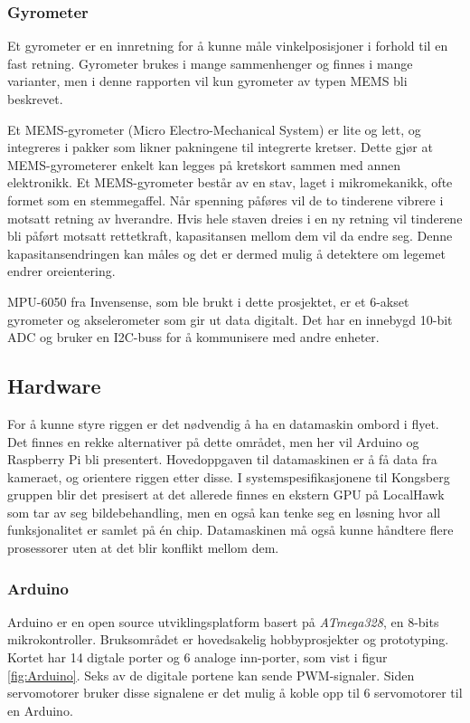 \subsubsection{Gyrometer}

Et gyrometer er en innretning for å kunne måle vinkelposisjoner i forhold til en fast retning. Gyrometer brukes i mange sammenhenger og finnes i mange varianter, men i denne rapporten vil kun gyrometer av typen MEMS bli beskrevet. 

Et MEMS-gyrometer (Micro Electro-Mechanical System) er lite og lett, og integreres i pakker som likner pakningene til integrerte kretser. Dette gjør at MEMS-gyrometerer enkelt kan legges på kretskort sammen med annen elektronikk. Et MEMS-gyrometer består av en stav, laget i mikromekanikk, ofte formet som en stemmegaffel. Når spenning påføres vil de to tinderene vibrere i motsatt retning av hverandre. Hvis hele staven dreies i en ny retning vil tinderene bli påført motsatt rettetkraft, kapasitansen mellom dem vil da endre seg. Denne kapasitansendringen kan måles og det er dermed mulig å detektere om legemet endrer oreientering.\cite{MEMS}

MPU-6050 fra Invensense, som ble brukt i dette prosjektet, er et 6-akset gyrometer og akselerometer som gir ut data digitalt. Det har en innebygd 10-bit ADC og bruker en I2C-buss for å kommunisere med andre enheter.\cite{InSens}

\subsection{Hardware}
For å kunne styre riggen er det nødvendig å ha en datamaskin ombord i flyet. Det finnes en rekke alternativer på dette området, men her vil Arduino og Raspberry Pi bli presentert. Hovedoppgaven til datamaskinen er å få data fra kameraet, og orientere riggen etter disse. I systemspesifikasjonene til Kongsberg gruppen blir det presisert at det allerede finnes en ekstern GPU på LocalHawk som tar av seg bildebehandling, men en også kan tenke seg en løsning hvor all funksjonalitet er samlet på én chip. Datamaskinen må også kunne håndtere flere prosessorer uten at det blir konflikt mellom dem.

\subsubsection{Arduino}
Arduino er en open source utviklingsplatform basert på \textit{ATmega328}, en 8-bits mikrokontroller. Bruksområdet er hovedsakelig hobbyprosjekter og prototyping. Kortet har 14 digtale porter og 6 analoge inn-porter, som vist i figur \ref{fig:Arduino}. Seks av de digitale portene kan sende PWM-signaler. Siden servomotorer bruker disse signalene er det mulig å koble opp til 6 servomotorer til en Arduino. 

